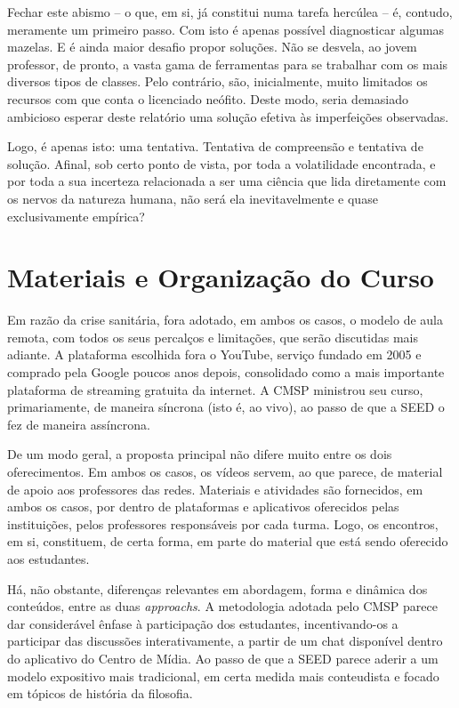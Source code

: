 \documentclass[12pt,a4paper]{article}
\begin{document}
	Fechar este abismo -- o que, em si, já constitui numa tarefa hercúlea --
	é, contudo, meramente um primeiro passo. Com isto é 
	apenas possível diagnosticar algumas mazelas. E é ainda maior desafio 
	propor soluções. Não se desvela, ao jovem professor, de pronto, 
	a vasta gama de ferramentas para se trabalhar com os mais diversos 
	tipos de classes. Pelo contrário, são, inicialmente, muito limitados 
	os recursos com que conta o licenciado neófito. Deste modo, seria 
	demasiado ambicioso esperar deste relatório uma solução efetiva 
	às imperfeições observadas. 

	Logo, é apenas isto: uma tentativa. Tentativa de compreensão e 
	tentativa de solução. Afinal, sob certo ponto de vista, por toda a 
	volatilidade encontrada, e por toda a sua incerteza relacionada a 
	ser uma ciência que lida diretamente com os nervos da natureza 
	humana, não será ela inevitavelmente e quase exclusivamente empírica? 
	
	\newpage
	
	\section{Materiais e Organização do Curso}

	Em razão da crise sanitária, fora adotado, em ambos os casos, o 
	modelo de aula remota, com todos os seus percalços e limitações, 
	que serão discutidas mais adiante. A plataforma escolhida fora o 
	YouTube, serviço fundado em 2005 e comprado pela Google poucos 
	anos depois, consolidado como a mais importante plataforma de 
	streaming gratuita da internet. A CMSP ministrou seu curso, 
	primariamente, de maneira síncrona (isto é, ao vivo), ao passo de 
	que a SEED o fez de maneira assíncrona. 

	De um modo geral, a proposta principal não difere muito entre 
	os dois oferecimentos. Em ambos os casos, os vídeos servem, ao que 
	parece, de material de apoio aos professores das redes. Materiais 
	e atividades são fornecidos, em ambos os casos, por dentro de 
	plataformas e aplicativos oferecidos pelas instituições, pelos 
	professores responsáveis por cada turma. Logo, os encontros, 
	em si, constituem, de certa forma, em parte do material que 
	está sendo oferecido aos estudantes. 

	Há, não obstante, diferenças relevantes em abordagem, forma e 
	dinâmica dos conteúdos, entre as duas \textit{approachs}. A 
	metodologia adotada pelo CMSP parece dar considerável ênfase 
	à participação dos estudantes, incentivando-os a participar das 
	discussões interativamente, a partir de um chat disponível dentro 
	do aplicativo do Centro de Mídia. Ao passo de que a SEED parece 
	aderir a um modelo expositivo mais tradicional, em certa medida 
	mais conteudista e focado em tópicos de história da filosofia. 
			
\end{document}
